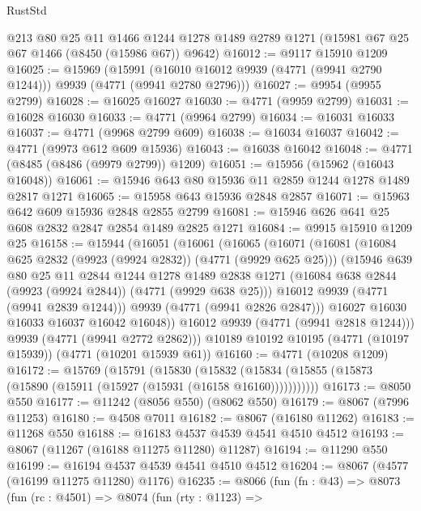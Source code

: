 \begin{lexlean}{RustStd}
\begin{coremodule}
    @213
    @80
    @25
    @11
    @1466
    @1244
    @1278
    @1489
    @2789
    @1271
    (@15981 @67 @25 @67 @1466 (@8450 (@15986 @67)) @9642)
@16012 := @9117 @15910 @1209
@16025 := @15969
    (@15991 (@16010 @16012 @9939 (@4771 (@9941 @2790 @1244))) @9939 (@4771 (@9941 @2780 @2796)))
@16027 := @9954 (@9955 @2799)
@16028 := @16025 @16027
@16030 := @4771 (@9959 @2799)
@16031 := @16028 @16030
@16033 := @4771 (@9964 @2799)
@16034 := @16031 @16033
@16037 := @4771 (@9968 @2799 @609)
@16038 := @16034 @16037
@16042 := @4771 (@9973 @612 @609 @15936)
@16043 := @16038 @16042
@16048 := @4771 (@8485 (@8486 (@9979 @2799)) @1209)
@16051 := @15956 (@15962 (@16043 @16048))
@16061 := @15946 @643 @80 @15936 @11 @2859 @1244 @1278 @1489 @2817 @1271
@16065 := @15958 @643 @15936 @2848 @2857
@16071 := @15963 @642 @609 @15936 @2848 @2855 @2799
@16081 := @15946 @626 @641 @25 @608 @2832 @2847 @2854 @1489 @2825 @1271
@16084 := @9915 @15910 @1209 @25
@16158 := @15944
    (@16051
      (@16061
        (@16065
          (@16071
            (@16081
              (@16084 @625 @2832 (@9923 (@9924 @2832)) (@4771 (@9929 @625 @25)))
              (@15946
                @639
                @80
                @25
                @11
                @2844
                @1244
                @1278
                @1489
                @2838
                @1271
                (@16084 @638 @2844 (@9923 (@9924 @2844)) (@4771 (@9929 @638 @25)))
                @16012
                @9939
                (@4771 (@9941 @2839 @1244)))
              @9939
              (@4771 (@9941 @2826 @2847)))
            @16027
            @16030
            @16033
            @16037
            @16042
            @16048))
        @16012
        @9939
        (@4771 (@9941 @2818 @1244)))
      @9939
      (@4771 (@9941 @2772 @2862)))
    @10189
    @10192
    @10195
    (@4771 (@10197 @15939))
    (@4771 (@10201 @15939 @61))
@16160 := @4771 (@10208 @1209)
@16172 := @15769
    (@15791
      (@15830
        (@15832 (@15834 (@15855 (@15873 (@15890 (@15911 (@15927 (@15931 (@16158 @16160)))))))))))
@16173 := @8050 @550
@16177 := @11242 (@8056 @550) (@8062 @550)
@16179 := @8067 (@7996 @11253)
@16180 := @4508 @7011
@16182 := @8067 (@16180 @11262)
@16183 := @11268 @550
@16188 := @16183 @4537 @4539 @4541 @4510 @4512
@16193 := @8067 (@11267 (@16188 @11275 @11280) @11287)
@16194 := @11290 @550
@16199 := @16194 @4537 @4539 @4541 @4510 @4512
@16204 := @8067 (@4577 (@16199 @11275 @11280) @1176)
@16235 := @8066
    (fun (fn : @43) =>
    @8073
      (fun (rc : @4501) =>
      @8074
        (fun (rty : @1123) =>

\end{coremodule}
\end{lexlean}
